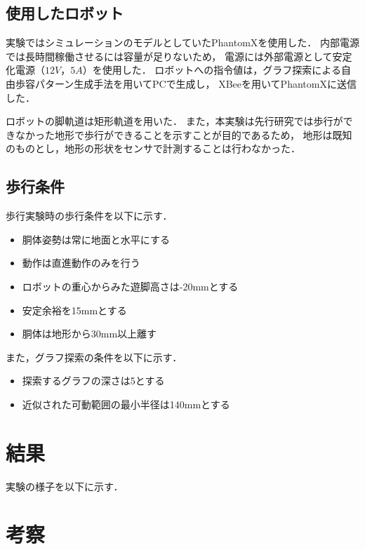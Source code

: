 \subsection{使用したロボット}
実験ではシミュレーションのモデルとしていたPhantomXを使用した．
内部電源では長時間稼働させるには容量が足りないため，
電源には外部電源として安定化電源（$12V，5A$）を使用した．
ロボットへの指令値は，グラフ探索による自由歩容パターン生成手法を用いてPCで生成し，
XBeeを用いてPhantomXに送信した．

ロボットの脚軌道は矩形軌道を用いた．
また，本実験は先行研究では歩行ができなかった地形で歩行ができることを示すことが目的であるため，
地形は既知のものとし，地形の形状をセンサで計測することは行わなかった．

\subsection{歩行条件}
歩行実験時の歩行条件を以下に示す．

\begin{itemize}
  \item 胴体姿勢は常に地面と水平にする
  \item 動作は直進動作のみを行う
  \item ロボットの重心からみた遊脚高さは-20mmとする
  \item 安定余裕を15mmとする
  \item 胴体は地形から30mm以上離す
\end{itemize}

また，グラフ探索の条件を以下に示す．

\begin{itemize}
  \item 探索するグラフの深さは5とする
  \item 近似された可動範囲の最小半径は140mmとする
\end{itemize}

\section{結果}
実験の様子を以下に示す．


\section{考察}